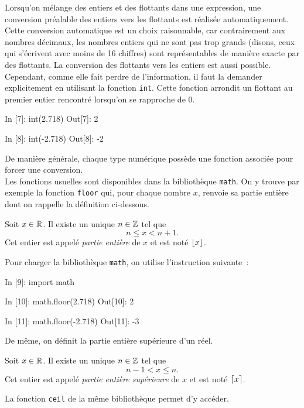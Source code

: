 \documentclass{magnolia}
\begin{document}
Lorsqu'on mélange des entiers et des flottants dans une expression,
une conversion préalable des entiers vers les flottants est réalisée automatiquement.
Cette conversion automatique est un choix raisonnable, car contrairement
aux nombres décimaux, les nombres entiers qui ne sont pas trop grands (disons, ceux qui s'écrivent
avec moins de 16 chiffres) sont représentables de manière exacte par des flottants.
La conversion des flottants vers les entiers est aussi possible. Cependant, comme elle fait perdre
de l'information, il faut la demander explicitement en utilisant la fonction \verb_int_.
Cette fonction arrondit un flottant au premier entier rencontré lorsqu'on se rapproche de 0.

\begin{pythoncode}
In [7]: int(2.718)
Out[7]: 2

In [8]: int(-2.718)
Out[8]: -2
\end{pythoncode}

\noindent De manière générale, chaque type numérique possède une fonction associée pour
forcer une conversion.\\

Les fonctions usuelles sont disponibles dans la bibliothèque \verb_math_. On y trouve
par exemple la fonction \verb_floor_ qui, pour chaque nombre $x$, renvoie sa partie entière dont on
rappelle la définition ci-dessous.

\begin{proposition}
Soit $x\in\mathbb{R}$. Il existe un unique $n\in\mathbb{Z}$ tel que
\[n\leq x<n+1.\]
Cet entier est appelé \emph{partie entière} de $x$ et est noté $\left\lfloor x\right\rfloor$.
\end{proposition}

\noindent
Pour charger la bibliothèque \verb_math_, on utilise l'instruction suivante~:

\begin{pythoncode}
In [9]: import math

In [10]: math.floor(2.718)
Out[10]: 2

In [11]: math.floor(-2.718)
Out[11]: -3
\end{pythoncode}

\noindent De même, on définit la partie entière supérieure d'un réel.
\begin{proposition}
Soit $x\in\mathbb{R}$. Il existe un unique $n\in\mathbb{Z}$ tel que
\[n-1< x\leq n.\]
Cet entier est appelé \emph{partie entière supérieure} de $x$ et est noté $\lceil x\rceil$.
\end{proposition}

\noindent
La fonction \verb_ceil_ de la même bibliothèque permet d'y accéder.
\end{document}

